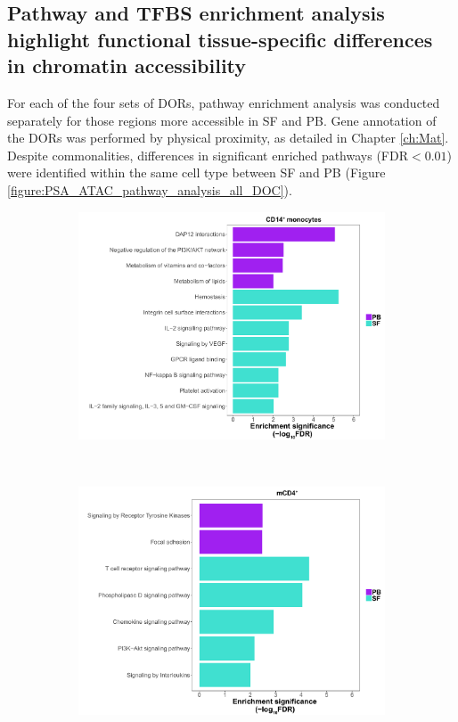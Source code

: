 \subsection{Pathway and TFBS enrichment analysis highlight functional tissue-specific differences in chromatin accessibility}

For each of the four sets of DORs, pathway enrichment analysis was conducted separately for those regions more accessible in SF and PB. Gene annotation of the DORs was performed by physical proximity, as detailed in Chapter \ref{ch:Mat}. Despite commonalities, differences in significant enriched pathways (FDR$<0.01$) were identified within the same cell type between SF and PB (Figure \ref{figure:PSA_ATAC_pathway_analysis_all_DOC}).


\begin{figure}[H]
\centering
\begin{subfigure}[b]{0.45\textwidth}
\centering 
\includegraphics[width=\textwidth]{./Results3/pdfs/ATAC_PSA_CD14_pathways_barplot_all_DOCS_proximity}
\caption{}
\end{subfigure}
~
\begin{subfigure}[b]{0.45\textwidth}
\centering 
\includegraphics[width=\textwidth]{./Results3/pdfs/ATAC_PSA_CD4_pathways_barplot_all_DOCS_proximity}

\end{subfigure}
\end{figure}
